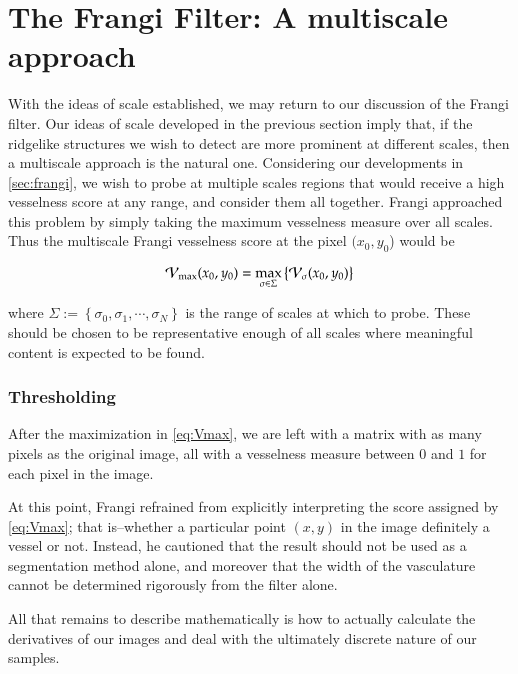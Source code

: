  \chapter{The Frangi Filter: A multiscale approach} \label{sec:frangi-multiscale}
    
     With the ideas of scale established, we may return to our discussion of the Frangi filter.
    Our ideas of scale developed in the previous section imply that, if the ridgelike structures we wish to detect are more prominent at different scales, then a multiscale approach is the natural one. Considering our
    developments in \cref{sec:frangi}, we wish to probe at multiple scales
    regions that would receive a high vesselness score at any range,
    and consider them all together. Frangi \cite{frangi-paper} approached this problem by simply taking the maximum vesselness measure over all scales. Thus the multiscale Frangi vesselness score at the pixel $(x_0, y_0$) would be 
    
    \begin{equation} \label{eq:Vmax}
    \mathcal{V}_{\max}(x_0, y_0) =
    	\underset{\sigma \in \Sigma}{\max}\left\{  \mathcal{V}_{\sigma} (x_0, y_0) \right\}
    \end{equation}
    
    where $\Sigma := \left\{ \sigma_0, \sigma_1 , \cdots, \sigma_N \right\}$ is
    the range of scales at which to probe. These should be chosen to be representative enough of all scales where meaningful content is expected to be found.
    
   
    \subsection{Thresholding}
    
    After the maximization in \cref{eq:Vmax}, we are left with a matrix with as many pixels as the original image, all with a vesselness measure between $0$ and $1$ for each pixel in the image.
       
    At this point, Frangi \cite{frangi-paper} refrained from explicitly interpreting the score assigned by \cref{eq:Vmax}; that is--whether a particular point $(x,y)$ in the image definitely a vessel or not. Instead, he cautioned that the result should not be used as a segmentation method alone, and moreover that the width of the vasculature cannot be determined rigorously from the filter alone.   
   

All that remains to describe mathematically is how to actually calculate the derivatives of our images and deal with the ultimately discrete nature of our samples.    